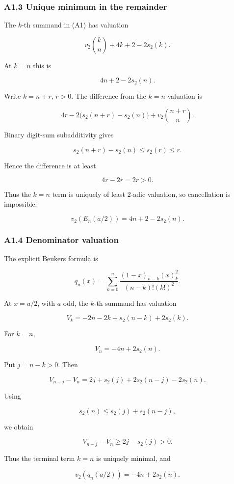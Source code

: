 \documentclass[
  10pt,
  letterpaper,
]{article}
\theoremstyle{definition}
\theoremstyle{remark}
\begin{document}
\subsubsection{A1.3 Unique minimum in the
remainder}\label{a1.3-unique-minimum-in-the-remainder}

The \(k\)-th summand in (A1) has valuation

\[
v_2\binom{k}{n}+4k+2-2s_2(k).
\]

At \(k=n\) this is

\[
4n+2-2s_2(n).
\]

Write \(k=n+r\), \(r>0\). The difference from the \(k=n\) valuation is

\[
4r
-
2\bigl(s_2(n+r)-s_2(n)\bigr)
+
v_2\binom{n+r}{n}.
\]

Binary digit-sum subadditivity gives

\[
s_2(n+r)-s_2(n)\le s_2(r)\le r.
\]

Hence the difference is at least

\[
4r-2r=2r>0.
\]

Thus the \(k=n\) term is uniquely of least \(2\)-adic valuation, so
cancellation is impossible:

\[
\boxed{
v_2(E_n(a/2))=4n+2-2s_2(n).
}
\tag{A3}
\]

\subsubsection{A1.4 Denominator
valuation}\label{a1.4-denominator-valuation}

The explicit Beukers formula is

\[
q_n(x)
=
\sum_{k=0}^{n}
\frac{(1-x)_{n-k}(x)_k^2}
{(n-k)!(k!)^2}.
\tag{A4}
\]

At \(x=a/2\), with \(a\) odd, the \(k\)-th summand has valuation

\[
V_k
=
-2n-2k+s_2(n-k)+2s_2(k).
\]

For \(k=n\),

\[
V_n=-4n+2s_2(n).
\]

Put \(j=n-k>0\). Then

\[
V_{n-j}-V_n
=
2j+s_2(j)+2s_2(n-j)-2s_2(n).
\]

Using

\[
s_2(n)\le s_2(j)+s_2(n-j),
\]

we obtain

\[
V_{n-j}-V_n
\ge
2j-s_2(j)>0.
\]

Thus the terminal term \(k=n\) is uniquely minimal, and

\[
\boxed{
v_2(q_n(a/2))=-4n+2s_2(n).
}
\tag{A5}
\]
\end{document}
